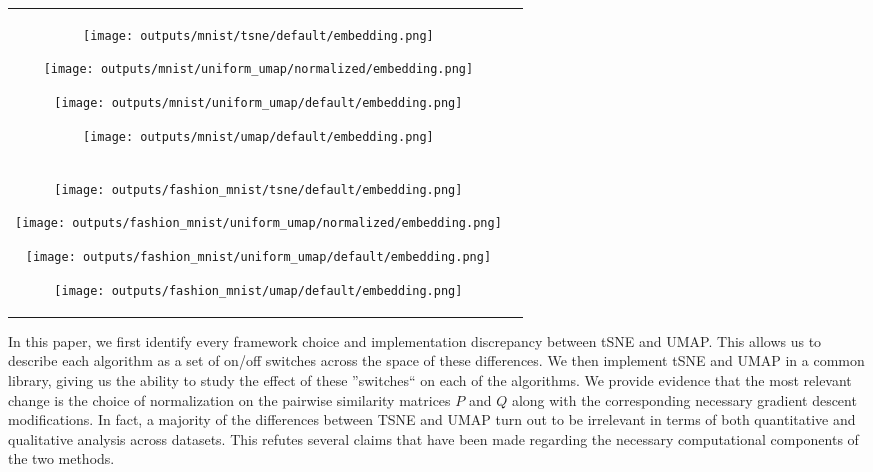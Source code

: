 \documentclass[sigconf, nonacm]{acmart}
\newcommand\ourmethod{Uniform UMAP }
\begin{document}
\begin{figure*}[h]
    \begin{tabular}{cc}
        \texttt{[image: outputs/mnist/tsne/default/embedding.png]}\par
        \texttt{[image: outputs/mnist/uniform\_umap/normalized/embedding.png]}\par
        \texttt{[image: outputs/mnist/uniform\_umap/default/embedding.png]}\par
        \texttt{[image: outputs/mnist/umap/default/embedding.png]}\\
        \texttt{[image: outputs/fashion\_mnist/tsne/default/embedding.png]}\par
        \texttt{[image: outputs/fashion\_mnist/uniform\_umap/normalized/embedding.png]}\par
        \texttt{[image: outputs/fashion\_mnist/uniform\_umap/default/embedding.png]}\par
        \texttt{[image: outputs/fashion\_mnist/umap/default/embedding.png]}
    \end{tabular}
\caption{Uniform UMAP is able to recreate both TSNE and UMAP embeddings by just changing two hyperparameters. Images above are on the MNIST (top row) and
Fashion MNIST (bottom row) datasets. From left to right: TSNE, \ourmethod with normalization, \ourmethod and UMAP}
\end{figure*}

In this paper, we first identify every framework choice and implementation discrepancy between tSNE and UMAP. This allows us to describe each algorithm as a set of on/off
switches across the space of these differences. We then implement tSNE and UMAP in a common library, giving us the ability to study the effect of these
''switches`` on each of the algorithms.
We provide evidence that the most relevant change is the choice of normalization on the pairwise similarity matrices $P$ and $Q$ along with the corresponding
necessary gradient descent modifications.
In fact, a majority of the differences between TSNE and UMAP turn out to be irrelevant in terms of both quantitative and qualitative analysis across datasets.
This refutes several claims that have been made regarding the necessary computational components of the two methods.
\end{document}
